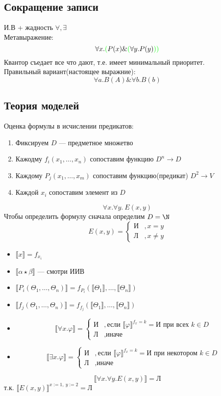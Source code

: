 \documentclass[english]{article}
\begin{document}
\subsection{Сокращение записи}
\label{sec:org78ae438}
И.В + жадность \(\forall, \exists\) \\
Метавыражение:
\[ \forall x. \color{green}(\color{black}P(x) \& \color{green}(\color{black}\forall y. P(y) \color{green}))\color{black} \]
Квантор съедает все что дают, т.е. имеет минимальный приоритет. \\
Правильный вариант(настоящее выражние):
\[ \forall a. B(A) \& \forall b. B(b) \]
\subsection{Теория моделей}
\label{sec:orge7d20a5}
Оценка формулы в исчислении предикатов:
\begin{enumerate}
	\item Фиксируем \(D\) --- предметное множетво
	\item Кажодму \(f_i(x_1, \dots, x_n)\) сопоставим функцию \(D^n \to D\)
	\item Каждому \(P_j(x_1, \dots, x_m)\) сопоставим функцию(предикат) \(D^2 \to V\)
	\item Каждой \(x_i\) сопоставим элемент из \(D\)
\end{enumerate}
\begin{examp}
	\[\forall x.\forall y.\ E(x, y)\]
	Чтобы определить формулу сначала определим \(D = \N\)
	\[ E(x, y) = \begin{cases}\text{И} & ,x = y \\ \text{Л} &, x\neq y\end{cases} \]
	\begin{itemize}
		\item \(\llbracket x \rrbracket = f_{x_i}\)
		\item \(\llbracket \alpha \star \beta \rrbracket\) --- смотри ИИВ
		\item \(\llbracket P_i(\Theta_1, \dots , \Theta_n) \rrbracket = f_{P_i}(\llbracket \Theta_1 \rrbracket, \dots, \llbracket \Theta_n \rrbracket)\)
		\item \(\llbracket f_j(\Theta_1 , \dots, \Theta_n ) \rrbracket = f_{f_j}(\llbracket \Theta_1 \rrbracket, \dots, \llbracket \Theta_n \rrbracket)\)
		\item \[ \llbracket \forall x. \varphi \rrbracket = \begin{cases} \text{И} & , \text{если } \llbracket \varphi \rrbracket^{f_x = k} = \text{И}\text{ при всех } k \in D  \\ \text{Л} &,\text{иначе}\end{cases} \]
		\item \[ \llbracket \exists x.\varphi \rrbracket = \begin{cases} \text{И} &, \text{если } \llbracket \varphi \rrbracket^{f_x = k} = \text{И при некотором } k \in D \\ \text{Л} &,\text{иначе} \end{cases} \]
	\end{itemize}
	\[ \llbracket \forall x.\forall y.E(x, y) \rrbracket = \text{Л} \]
	т.к. \(\llbracket E(x, y) \rrbracket^{x:=1,\ y:=2} = \text{Л}\)
\end{examp}
\end{document}
